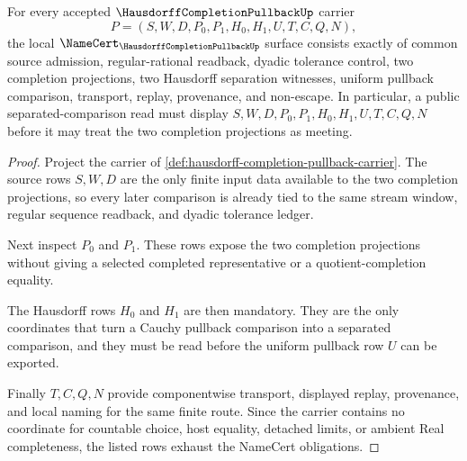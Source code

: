 \begin{theorem}
\label{thm:hausdorff-completion-pullback-namecert-obligations}
For every accepted $\HausdorffCompletionPullbackUp$ carrier
$$
P=(S,W,D,P_0,P_1,H_0,H_1,U,T,C,Q,N),
$$
the local $\NameCert_{\HausdorffCompletionPullbackUp}$ surface consists exactly of common source admission, regular-rational readback, dyadic tolerance control, two completion projections, two Hausdorff separation witnesses, uniform pullback comparison, transport, replay, provenance, and non-escape. In particular, a public separated-comparison read must display $S,W,D,P_0,P_1,H_0,H_1,U,T,C,Q,N$ before it may treat the two completion projections as meeting.
\end{theorem}
\begin{proof}
Project the carrier of \autoref{def:hausdorff-completion-pullback-carrier}. The source rows $S,W,D$ are the only finite input data available to the two completion projections, so every later comparison is already tied to the same stream window, regular sequence readback, and dyadic tolerance ledger.

Next inspect $P_0$ and $P_1$. These rows expose the two completion projections without giving a selected completed representative or a quotient-completion equality.

The Hausdorff rows $H_0$ and $H_1$ are then mandatory. They are the only coordinates that turn a Cauchy pullback comparison into a separated comparison, and they must be read before the uniform pullback row $U$ can be exported.

Finally $T,C,Q,N$ provide componentwise transport, displayed replay, provenance, and local naming for the same finite route. Since the carrier contains no coordinate for countable choice, host equality, detached limits, or ambient Real completeness, the listed rows exhaust the NameCert obligations.
\end{proof}

